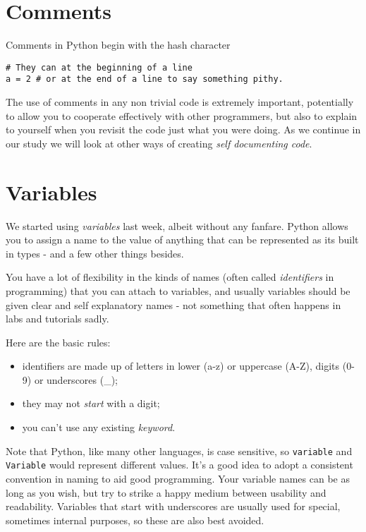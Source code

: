 \documentclass[12pt,oneside]{cttutorial}
\begin{document}
\section{Comments}

Comments in Python begin with the hash character
\begin{lstlisting}
# They can at the beginning of a line
a = 2 # or at the end of a line to say something pithy.
\end{lstlisting}

The use of comments in any non trivial code is extremely important, potentially to allow you to cooperate effectively
with other programmers, but also to explain to yourself when you revisit the code just what you were doing. As we
continue in our study we will look at other ways of creating \emph{self documenting code}.


\section{Variables}

We started using \emph{variables} last week, albeit without any fanfare. Python allows you to assign a name to the value of anything that can be represented as its built in types - and a few other things besides.

You have a lot of flexibility in the kinds of names (often called \emph{identifiers} in programming) that you can attach to variables, and usually variables should be given clear and self explanatory names - not something that often happens in labs and tutorials sadly.

Here are the basic rules:
\begin{itemize}
\item identifiers are made up of letters in lower (a-z) or uppercase (A-Z), digits (0-9) or underscores (\_);
\item they may not \emph{start} with a digit;
\item you can't use any existing \emph{keyword}.
\end{itemize}

Note that Python, like many other languages, is case sensitive, so \lstinline!variable! and \lstinline!Variable! would represent different values. It's a good idea to adopt a consistent convention in naming to aid good programming. Your variable names can be as long as you wish, but try to strike a happy medium between usability and readability. Variables that start with underscores are usually used for special, sometimes internal purposes, so these are also best avoided.
\end{document}
